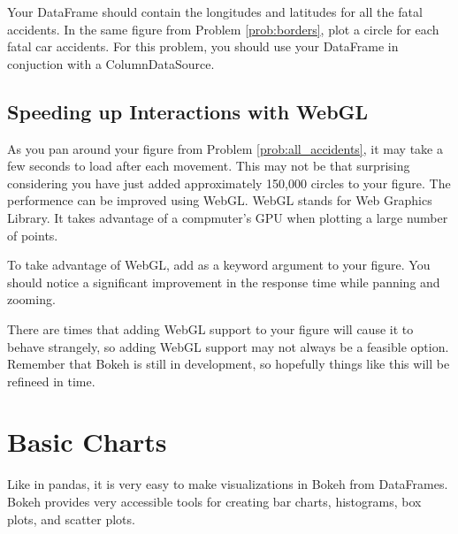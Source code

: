 \begin{problem} \label{prob:all_accidents}
Your  DataFrame should contain the longitudes and latitudes for
all the fatal accidents. In the same figure from Problem \ref{prob:borders},
plot a circle for each fatal car accidents. For this problem, you should use
your  DataFrame in conjuction with a ColumnDataSource.
\end{problem}

\subsection*{Speeding up Interactions with WebGL}
As you pan around your figure from Problem \ref{prob:all_accidents}, it may take
a few seconds to load after each movement. This may not be that surprising
considering you have just added approximately 150,000 circles to your figure.
The performence can be improved using WebGL. WebGL stands for Web Graphics
Library. It takes advantage of a compmuter's GPU when plotting a large number of
points.

\begin{problem} \label{prob:webgl}
To take advantage of WebGL, add  as a keyword argument to
your figure. You should notice a significant improvement in the response time
while panning and zooming.

\begin{info}
There are times that adding WebGL support to your figure will cause it to behave
strangely, so adding WebGL support may not always be a feasible option. Remember
that Bokeh is still in development, so hopefully things like this will be refineed
in time.
\end{info}
\end{problem}

\section*{Basic Charts}
Like in pandas, it is very easy to make visualizations in Bokeh from DataFrames.
Bokeh provides very accessible tools for creating bar charts, histograms, box
plots, and scatter plots.

